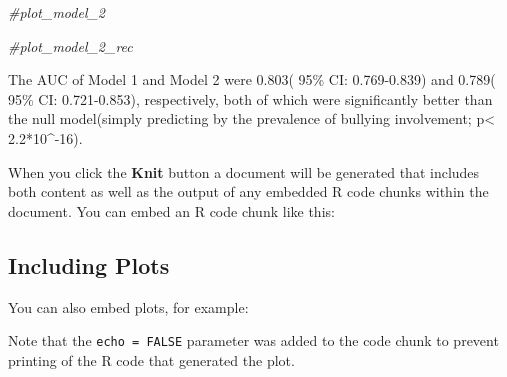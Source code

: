 \documentclass[
]{article}
\newenvironment{Shaded}{\begin{snugshade}}{\end{snugshade}}
\newcommand{\CommentTok}[1]{\textcolor[rgb]{0.56,0.35,0.01}{\textit{#1}}}
\begin{document}
\begin{Shaded}
\begin{Highlighting}[]
\CommentTok{#plot_model_2}
\end{Highlighting}
\end{Shaded}

\begin{Shaded}
\begin{Highlighting}[]
\CommentTok{#plot_model_2_rec}
\end{Highlighting}
\end{Shaded}

The AUC of Model 1 and Model 2 were 0.803( 95\% CI: 0.769-0.839) and
0.789( 95\% CI: 0.721-0.853), respectively, both of which were
significantly better than the null model(simply predicting by the
prevalence of bullying involvement; p\textless{} 2.2*10\^{}-16).

When you click the \textbf{Knit} button a document will be generated
that includes both content as well as the output of any embedded R code
chunks within the document. You can embed an R code chunk like this:

\hypertarget{including-plots}{%
\subsection{Including Plots}\label{including-plots}}

You can also embed plots, for example:

Note that the \texttt{echo\ =\ FALSE} parameter was added to the code
chunk to prevent printing of the R code that generated the plot.
\end{document}
